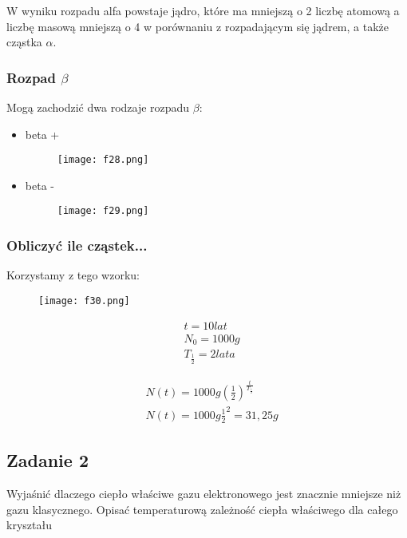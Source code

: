 \documentclass[a4paper,15pt]{article}
\newcommand{\issue}[2]{
    \begin{tcolorbox}[colback=issueColor!5!white,colframe=issueColor,title={Zagadnienie #1}]
        #2
    \end{tcolorbox}
}
\begin{document}
W wyniku rozpadu alfa powstaje jądro, które ma mniejszą o 2 liczbę atomową a liczbę masową mniejszą o 4 w porównaniu z rozpadającym się jądrem, a także cząstka $\alpha$.


\subsubsection{Rozpad $\beta$}

Mogą zachodzić dwa rodzaje rozpadu $\beta$:

\begin{itemize}
\item beta +
\begin{figure}[H]
\centerline{\texttt{[image: f28.png]}}
\end{figure}


\item beta -
\begin{figure}[H]
\centerline{\texttt{[image: f29.png]}}
\end{figure}

\end{itemize}


\subsubsection{Obliczyć ile cząstek...}

Korzystamy z tego wzorku:
\begin{figure}[H]
\centerline{\texttt{[image: f30.png]}}
\end{figure}

\begin{align*}
& t = 10 lat \\
& N_0 = 1000 g \\
& T_{\frac{1}{2}} = 2 lata
\end{align*}

\begin{align*}
& N(t) = 1000g (\frac{1}{2})^{\frac{t}{T_{\frac{1}{2}}}} \\
& N(t) = 1000g \frac{1}{2}^2 = 31,25 g
\end{align*}

\newpage

\subsection{Zadanie 2}

\issue{}{
Wyjaśnić dlaczego ciepło właściwe gazu elektronowego jest znacznie mniejsze niż gazu klasycznego. Opisać temperaturową zależność ciepła właściwego dla całego kryształu
}
\end{document}
